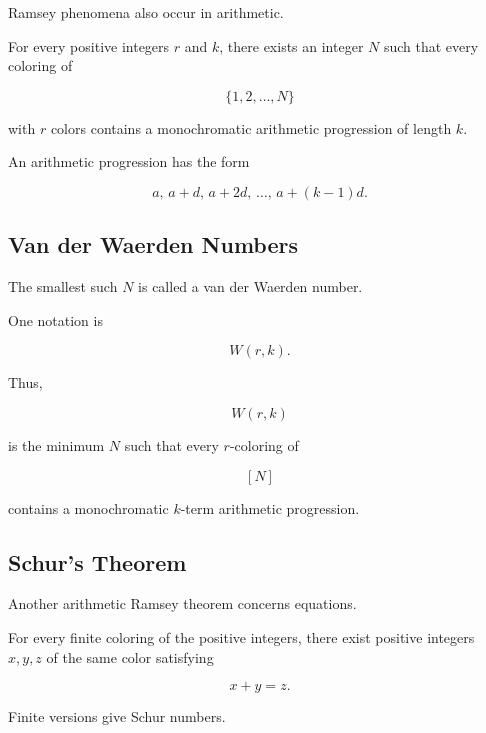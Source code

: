 Ramsey phenomena also occur in arithmetic.

\begin{theorem}
For every positive integers \(r\) and \(k\), there exists an integer
\(N\) such that every coloring of

\[
\{1,2,\ldots,N\}
\]

with \(r\) colors contains a monochromatic arithmetic progression of
length \(k\).
\end{theorem}

An arithmetic progression has the form

\[
\boxed{
a,\,
a+d,\,
a+2d,\,
\ldots,\,
a+(k-1)d.
}
\]

\subsection{Van der Waerden Numbers}
\label{subsec:van-der-waerden-numbers}

The smallest such \(N\) is called a van der Waerden number.

One notation is

\[
\boxed{
W(r,k).
}
\]

Thus,

\[
W(r,k)
\]

is the minimum \(N\) such that every \(r\)-coloring of

\[
[N]
\]

contains a monochromatic \(k\)-term arithmetic progression.

\subsection{Schur's Theorem}
\label{subsec:schurs-theorem}

Another arithmetic Ramsey theorem concerns equations.

\begin{theorem}
For every finite coloring of the positive integers, there exist
positive integers \(x,y,z\) of the same color satisfying

\[
\boxed{
x+y=z.
}
\]
\end{theorem}

Finite versions give Schur numbers.

